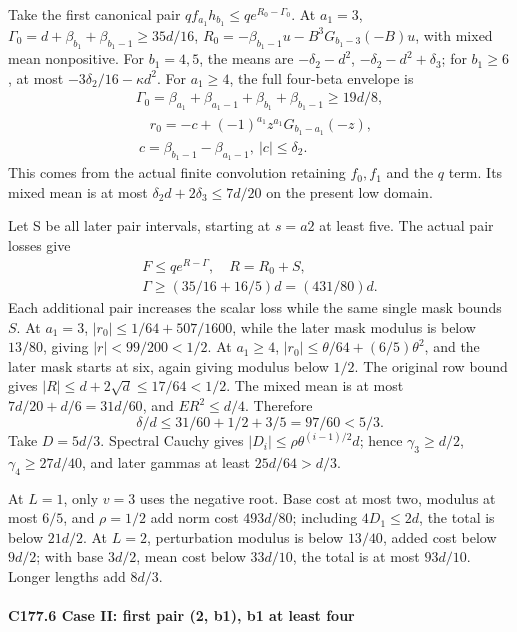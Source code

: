 Take the first canonical pair \(qf_{a_1}h_{b_1}\le qe^{R_0-\Gamma_0}\). At \(a_1=3\), \(\Gamma_0=d+\beta_{b_1}+\beta_{b_1-1}\ge35d/16\), \(R_0=-\beta_{b_1-1}u-B^3G_{b_1-3}(-B)u\), with mixed mean nonpositive. For \(b_1=4,\allowbreak \allowbreak  5\), the means are \(-\delta_2-d^2\), \(-\delta_2-d^2+\delta_3\); for \(b_1\ge6\), at most \(-3\delta_2/16-\kappa d^2\). For \(a_1\ge4\), the full four-beta envelope is
\[
\begin{gathered}
\Gamma_0=\beta_{a_1}+\beta_{a_1-1}+\beta_{b_1}+\beta_{b_1-1}\ge19d/8,\\
\quad r_0=-c+(-1)^{a_1}z^{a_1}G_{b_1-a_1}(-z),\\
\ c=\beta_{b_1-1}-\beta_{a_1-1},\ |c|\le \delta_2.
\end{gathered}
\]
This comes from the actual finite convolution retaining \(f_0,\allowbreak \allowbreak  f_1\) and the \(q\) term. Its mixed mean is at most \(\delta_2d+2\delta_3\le7d/20\) on the present low domain.

Let S be all later pair intervals, starting at \(s=a2\) at least five. The actual pair losses give
\[
\begin{gathered}
F\le q e^{R-\Gamma},\quad R=R_0+S,\quad\\
\Gamma\ge(35/16+16/5)d=(431/80)d.
\end{gathered}\tag{C177.T184.23}
\]
Each additional pair increases the scalar loss while the same single mask bounds \(S\). At \(a_1=3\), \(|r_0|\le1/64+507/1600\), while the later mask modulus is below \(13/80\), giving \(|r|<99/200<1/2\). At \(a_1\ge4\), \(|r_0|\le\theta/64+(6/5)\theta^2\), and the later mask starts at six, again giving modulus below \(1/2\). The original row bound gives \(|R|\le d+2\sqrt d\le17/64<1/2\). The mixed mean is at most \(7d/20+d/6=31d/60\), and \(ER^2\le d/4\). Therefore
\[
\delta/d\le31/60+1/2+3/5=97/60<5/3.
\]
Take \(D=5d/3\). Spectral Cauchy gives \(|D_i|\le\rho\theta^{(i-1)/2}d\); hence \(\gamma_3\ge d/2\), \(\gamma_4\ge27d/40\), and later gammas at least \(25d/64>d/3\).

At \(L=1\), only \(v=3\) uses the negative root. Base cost at most two, modulus at most \(6/5\), and \(\rho=1/2\) add norm cost \(493d/80\); including \(4D_1\le2d\), the total is below \(21d/2\). At \(L=2\), perturbation modulus is below \(13/40\), added cost below \(9d/2\); with base \(3d/2\), mean cost below \(33d/10\), the total is at most \(93d/10\). Longer lengths add \(8d/3\).

\paragraph{C177.6 Case II: first pair (2, b1), b1 at least four}

